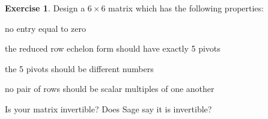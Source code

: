 \documentclass[11pt]{amsart}
\theoremstyle{definition}
\newtheorem{exercise}{Exercise}
\begin{document}
\begin{exercise}
Design a $6 \times 6$ matrix which has the following properties:
\begin{compactitem}
\item no entry equal to zero
\item the reduced row echelon form should have exactly 5 pivots
\item the 5 pivots should be different numbers
\item no pair of rows should be scalar multiples of one another
\end{compactitem}
Is your matrix invertible? Does Sage say it is invertible?
\end{exercise}
\end{document}

